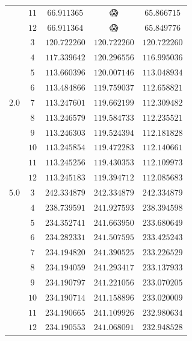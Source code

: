 \documentclass[
    a4paper, aps, twocolumn, floatfix, superscriptaddress,
    nofootinbib]{revtex4-1}
\newcommand{\nan}{\DejaSans 😱}
\newcommand{\1}{\mathds{1}}
\begin{document}
\begin{table}
\begin{ruledtabular}
\begin{tabular}{c|c|ccc}
                          & $11$ & $66.911365$ & \nan & $65.866715$ \\
                          & $12$ & $66.911364$ & \nan & $65.849776$ \\
                    \hline
                          & $3$ & $120.722260$ & $120.722260$ & $120.722260$ \\
                          & $4$ & $117.339642$ & $120.296556$ & $116.995036$ \\
                          & $5$ & $113.660396$ & $120.007146$ & $113.048934$ \\
                          & $6$ & $113.484866$ & $119.759037$ & $112.658821$ \\
                    $2.0$ & $7$ & $113.247601$ & $119.662199$ & $112.309482$ \\
                          & $8$ & $113.246579$ & $119.584733$ & $112.235521$ \\
                          & $9$ & $113.246303$ & $119.524394$ & $112.181828$ \\
                          & $10$ & $113.245854$ & $119.472283$ & $112.140661$ \\
                          & $11$ & $113.245256$ & $119.430353$ & $112.109973$ \\
                          & $12$ & $113.245183$ & $119.394712$ & $112.085683$ \\
                    \hline
                    $5.0$ & $3$ & $242.334879$ & $242.334879$ & $242.334879$ \\
                          & $4$ & $238.739591$ & $241.927593$ & $238.394598$ \\
                          & $5$ & $234.352741$ & $241.663950$ & $233.680649$ \\
                          & $6$ & $234.282331$ & $241.507595$ & $233.425243$ \\
                          & $7$ & $234.194820$ & $241.390525$ & $233.226529$ \\
                          & $8$ & $234.194059$ & $241.293417$ & $233.137933$ \\
                          & $9$ & $234.190797$ & $241.221056$ & $233.070205$ \\
                          & $10$ & $234.190714$ & $241.158896$ & $233.020009$ \\
                          & $11$ & $234.190665$ & $241.109926$ & $232.980634$ \\
                          & $12$ & $234.190553$ & $241.068091$ & $232.948528$
                \end{tabular}
            \end{ruledtabular}
            \label{tab:N12}
        \end{table}
\end{document}

